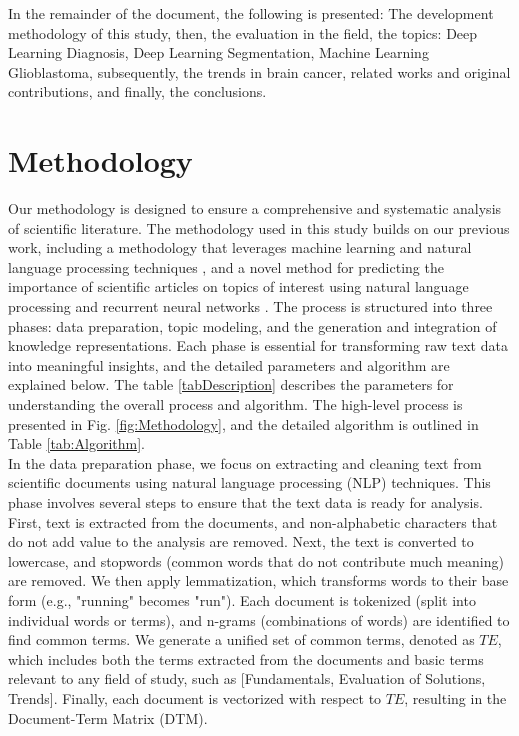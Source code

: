 \documentclass[runningheads]{llncs}
\begin{document}
In the remainder of the document, the following is presented: The development methodology of this study, then, the evaluation in the field, the topics: Deep Learning Diagnosis, Deep Learning Segmentation, Machine Learning Glioblastoma,  subsequently, the trends in brain cancer, related works and original contributions, and finally, the conclusions.
\section{Methodology}

Our methodology is designed to ensure a comprehensive and systematic analysis of scientific literature. The methodology used in this study builds on our previous work, including a methodology that leverages machine learning and natural language processing techniques \cite{Hurtado2023}, and a novel method for predicting the importance of scientific articles on topics of interest using natural language processing and recurrent neural networks \cite{Lopez2024}. The process is structured into three phases: data preparation, topic modeling, and the generation and integration of knowledge representations. Each phase is essential for transforming raw text data into meaningful insights, and the detailed parameters and algorithm are explained below. The table \ref{tabDescription} describes the parameters for understanding the overall process and algorithm. The high-level process is presented in Fig. \ref{fig:Methodology}, and the detailed algorithm is outlined in Table \ref{tab:Algorithm}.\\ 

In the data preparation phase, we focus on extracting and cleaning text from scientific documents using natural language processing (NLP) techniques. This phase involves several steps to ensure that the text data is ready for analysis. First, text is extracted from the documents, and non-alphabetic characters that do not add value to the analysis are removed. Next, the text is converted to lowercase, and stopwords (common words that do not contribute much meaning) are removed. We then apply lemmatization, which transforms words to their base form (e.g., "running" becomes "run"). Each document is tokenized (split into individual words or terms), and n-grams (combinations of words) are identified to find common terms. We generate a unified set of common terms, denoted as $TE$, which includes both the terms extracted from the documents and basic terms relevant to any field of study, such as [Fundamentals, Evaluation of Solutions, Trends]. Finally, each document is vectorized with respect to $TE$, resulting in the Document-Term Matrix (DTM).\\
\end{document}
